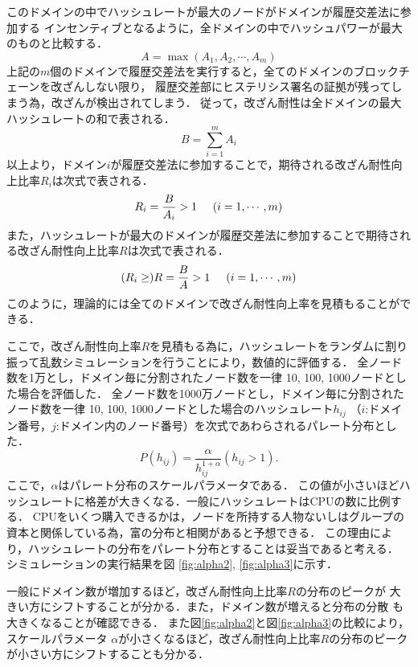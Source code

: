 \documentclass[a4paper,12pt]{jsarticle}
\begin{document}
このドメインの中でハッシュレートが最大のノードがドメインが履歴交差法に参加する
インセンティブとなるように，全ドメインの中でハッシュパワーが最大のものと比較する．
%
\begin{equation}
A = \max(A_1, A_2, \cdots, A_m)
\end{equation}
%
上記の$m$個のドメインで履歴交差法を実行すると，全てのドメインのブロックチェーンを改ざんしない限り，
履歴交差部にヒステリシス署名の証拠が残ってしまう為，改ざんが検出されてしまう．
従って，改ざん耐性は全ドメインの最大ハッシュレートの和で表される．
%
\begin{equation}
	B = \sum_{i=1}^{m} A_i
\end{equation}
%
以上より，ドメイン$i$が履歴交差法に参加することで，期待される改ざん耐性向上比率$R_i$は次式で表される．
%
\begin{equation}
	R_i = \frac{B}{A_i} > 1 \hspace{5mm} (i=1, \cdots, m)
\end{equation}
%
また，ハッシュレートが最大のドメインが履歴交差法に参加することで期待される改ざん耐性向上比率$R$は次式で表される．
%
\begin{equation}
	(R_i \ge) R = \frac{B}{A} > 1  \hspace{5mm} (i=1, \cdots, m)
\end{equation}
%
このように，理論的には全てのドメインで改ざん耐性向上率を見積もることができる．

ここで，改ざん耐性向上率$R$を見積もる為に，ハッシュレートをランダムに割り振って乱数シミュレーションを行うことにより，数値的に評価する．
全ノード数を1万とし，ドメイン毎に分割されたノード数を一律 10, 100, 1000ノードとした場合を評価した．
全ノード数を1000万ノードとし，ドメイン毎に分割されたノード数を一律 10, 100, 1000ノードとした場合のハッシュレート$ h_{ij} $ （$i$:ドメイン番号，$j$:ドメイン内のノード番号）を次式であわらされるパレート分布とした．
%
\begin{equation}
	P(h_{ij}) = \frac{\alpha}{h_{ij}^{1+\alpha}} (h_{ij} > 1).
\end{equation}
%
ここで，$\alpha$はパレート分布のスケールパラメータである．
この値が小さいほどハッシュレートに格差が大きくなる．一般にハッシュレートはCPUの数に比例する．
CPUをいくつ購入できるかは，ノードを所持する人物ないしはグループの資本と関係している為，富の分布と相関があると予想できる．
この理由により，ハッシュレートの分布をパレート分布とすることは妥当であると考える．
シミュレーションの実行結果を図 \ref{fig:alpha2}, \ref{fig:alpha3}に示す．

一般にドメイン数が増加するほど，改ざん耐性向上比率$R$の分布のピークが
大きい方にシフトすることが分かる．また，ドメイン数が増えると分布の分散
も大きくなることが確認できる．
また図\ref{fig:alpha2}と図\ref{fig:alpha3}の比較により，スケールパラメータ
$\alpha$が小さくなるほど，改ざん耐性向上比率$R$の分布のピークが小さい方にシフトすることも分かる．
\end{document}
